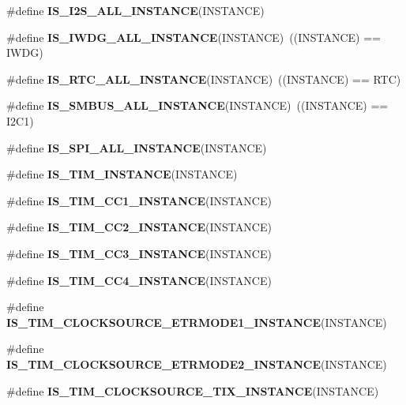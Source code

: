\begin{DoxyCompactItemize}
\item 
\#define {\bfseries I\+S\+\_\+\+I2\+S\+\_\+\+A\+L\+L\+\_\+\+I\+N\+S\+T\+A\+N\+CE}(I\+N\+S\+T\+A\+N\+CE)
\item 
\mbox{\label{group___exported__macro_gad9ec4c52f0572ee67d043e006f1d5e39}} 
\#define {\bfseries I\+S\+\_\+\+I\+W\+D\+G\+\_\+\+A\+L\+L\+\_\+\+I\+N\+S\+T\+A\+N\+CE}(I\+N\+S\+T\+A\+N\+CE)~((I\+N\+S\+T\+A\+N\+CE) == I\+W\+DG)
\item 
\mbox{\label{group___exported__macro_gab4230e8bd4d88adc4250f041d67375ce}} 
\#define {\bfseries I\+S\+\_\+\+R\+T\+C\+\_\+\+A\+L\+L\+\_\+\+I\+N\+S\+T\+A\+N\+CE}(I\+N\+S\+T\+A\+N\+CE)~((I\+N\+S\+T\+A\+N\+CE) == R\+TC)
\item 
\mbox{\label{group___exported__macro_gaf492fcfe71eab8d1dadf4d837b840af6}} 
\#define {\bfseries I\+S\+\_\+\+S\+M\+B\+U\+S\+\_\+\+A\+L\+L\+\_\+\+I\+N\+S\+T\+A\+N\+CE}(I\+N\+S\+T\+A\+N\+CE)~((I\+N\+S\+T\+A\+N\+CE) == I2\+C1)
\item 
\#define {\bfseries I\+S\+\_\+\+S\+P\+I\+\_\+\+A\+L\+L\+\_\+\+I\+N\+S\+T\+A\+N\+CE}(I\+N\+S\+T\+A\+N\+CE)
\item 
\#define {\bfseries I\+S\+\_\+\+T\+I\+M\+\_\+\+I\+N\+S\+T\+A\+N\+CE}(I\+N\+S\+T\+A\+N\+CE)
\item 
\#define {\bfseries I\+S\+\_\+\+T\+I\+M\+\_\+\+C\+C1\+\_\+\+I\+N\+S\+T\+A\+N\+CE}(I\+N\+S\+T\+A\+N\+CE)
\item 
\#define {\bfseries I\+S\+\_\+\+T\+I\+M\+\_\+\+C\+C2\+\_\+\+I\+N\+S\+T\+A\+N\+CE}(I\+N\+S\+T\+A\+N\+CE)
\item 
\#define {\bfseries I\+S\+\_\+\+T\+I\+M\+\_\+\+C\+C3\+\_\+\+I\+N\+S\+T\+A\+N\+CE}(I\+N\+S\+T\+A\+N\+CE)
\item 
\#define {\bfseries I\+S\+\_\+\+T\+I\+M\+\_\+\+C\+C4\+\_\+\+I\+N\+S\+T\+A\+N\+CE}(I\+N\+S\+T\+A\+N\+CE)
\item 
\#define {\bfseries I\+S\+\_\+\+T\+I\+M\+\_\+\+C\+L\+O\+C\+K\+S\+O\+U\+R\+C\+E\+\_\+\+E\+T\+R\+M\+O\+D\+E1\+\_\+\+I\+N\+S\+T\+A\+N\+CE}(I\+N\+S\+T\+A\+N\+CE)
\item 
\#define {\bfseries I\+S\+\_\+\+T\+I\+M\+\_\+\+C\+L\+O\+C\+K\+S\+O\+U\+R\+C\+E\+\_\+\+E\+T\+R\+M\+O\+D\+E2\+\_\+\+I\+N\+S\+T\+A\+N\+CE}(I\+N\+S\+T\+A\+N\+CE)
\item 
\#define {\bfseries I\+S\+\_\+\+T\+I\+M\+\_\+\+C\+L\+O\+C\+K\+S\+O\+U\+R\+C\+E\+\_\+\+T\+I\+X\+\_\+\+I\+N\+S\+T\+A\+N\+CE}(I\+N\+S\+T\+A\+N\+CE)

\end{DoxyCompactItemize}

